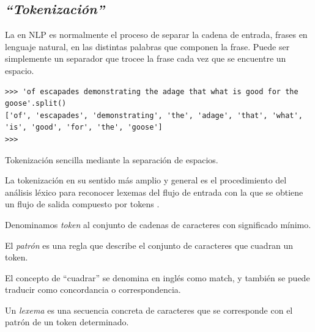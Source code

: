 \subsection{\emph{``Tokenización''}}

La  en NLP es normalmente el proceso de separar la cadena de entrada, frases en lenguaje natural, en las distintas palabras que componen la frase. Puede ser simplemente un separador que trocee la frase cada vez que se encuentre un espacio.
\begin{listing}[H]
\begin{verbatim}
>>> 'of escapades demonstrating the adage that what is good for the goose'.split()
['of', 'escapades', 'demonstrating', 'the', 'adage', 'that', 'what', 'is', 'good', 'for', 'the', 'goose']
>>> 
\end{verbatim}
\caption{Tokenización sencilla mediante la separación de espacios.}
\label{lst:tokenizacion-sencilla}
\end{listing}

La tokenización en su sentido más amplio y general es el procedimiento del análisis léxico para reconocer lexemas del flujo de entrada con la que se obtiene un flujo de salida compuesto por tokens \citep[§2.2]{Jimenez2004}.

\begin{definition}[Token] 
Denominamos \emph{token} al conjunto de cadenas de caracteres con significado mínimo.
\end{definition}

\begin{definition}[Patrón] 
El \emph{patrón} es una regla que describe el conjunto de caracteres que cuadran un token.
\end{definition}

El concepto de ``cuadrar'' se denomina en inglés como match, y también se puede traducir como concordancia o correspondencia.

\begin{definition}[Lexema] 
Un \emph{lexema} es una secuencia concreta de caracteres que se corresponde con el patrón de un token determinado.
\end{definition}

